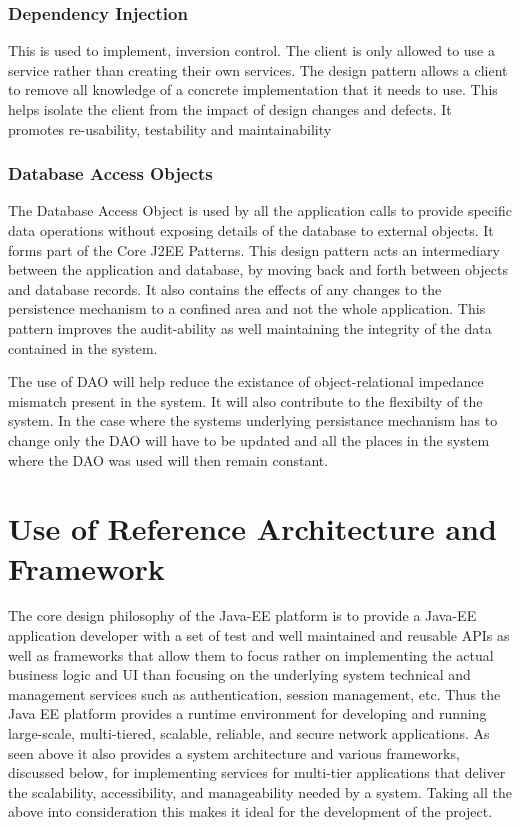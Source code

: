 \documentclass[12pt]{article}
\begin{document}
\subsubsection{Dependency Injection}
This is used to implement, inversion control. The client is only allowed to use a service rather than creating their own services. The design pattern allows a client to remove all knowledge of a concrete implementation that it needs to use. This helps isolate the client from the impact of design changes and defects. It promotes re-usability, testability and maintainability 

\subsubsection{Database Access Objects}
The Database Access Object is used by all the application calls to provide specific data operations without exposing details of the database to external objects. It forms part of the Core J2EE Patterns. This design pattern acts an intermediary between the application and database, by moving back and forth between objects and database records. It also contains the effects of any changes to the persistence mechanism to a confined area and not the whole application. This pattern improves the audit-ability as well maintaining the integrity of the data contained in the system. 

The use of DAO will help reduce the existance of object-relational impedance mismatch present in the system. It will also contribute to the flexibilty of the system. In the case where the systems underlying persistance mechanism has to change only the DAO will have to be updated and all the places in the system where the DAO was used will then remain constant.

\section{Use of Reference Architecture and Framework}
The core design philosophy of the Java-EE platform is to provide a Java-EE application developer with a set of test and well maintained and reusable APIs as well as frameworks that allow them to focus rather on implementing the actual business logic and UI than focusing on the underlying system technical and management services such as authentication, session management, etc. Thus the Java EE platform provides a runtime environment for developing and running large-scale, multi-tiered, scalable, reliable, and secure network applications. As seen above it also provides a system architecture and various frameworks, discussed below, for implementing services for multi-tier applications that deliver the scalability, accessibility, and manageability needed by a system. Taking all the above into consideration this makes it ideal for the development of the project.
\end{document}
